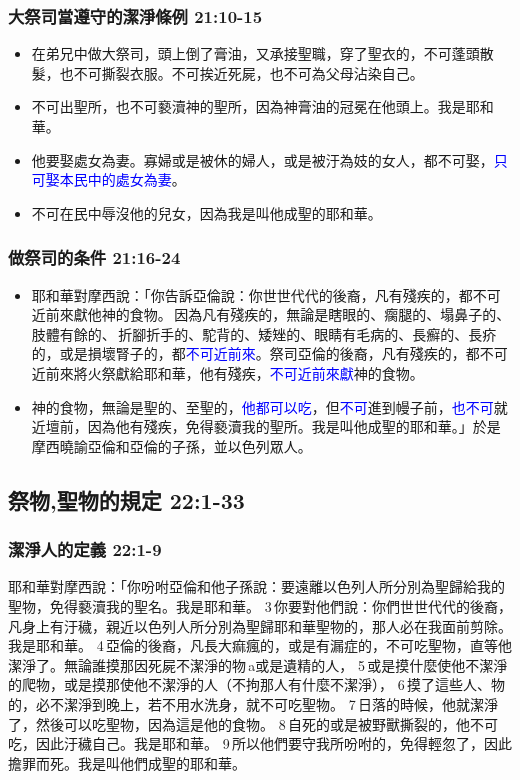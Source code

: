 \subsubsection{大祭司當遵守的潔淨條例 21:10-15}
\begin{itemize} 
\itemsep-.35em
\item 在弟兄中做大祭司，頭上倒了膏油，又承接聖職，穿了聖衣的，不可蓬頭散髮，也不可撕裂衣服。不可挨近死屍，也不可為父母沾染自己。 
\item 不可出聖所，也不可褻瀆神的聖所，因為神膏油的冠冕在他頭上。我是耶和華。
\item 他要娶處女為妻。寡婦或是被休的婦人，或是被汙為妓的女人，都不可娶，\textcolor{blue}{只可娶本民中的處女為妻}。 
\item 不可在民中辱沒他的兒女，因為我是叫他成聖的耶和華。
\end{itemize}

\subsubsection{做祭司的条件 21:16-24}
\begin{itemize} 
\itemsep-.35em
\item 耶和華對摩西說：「你告訴亞倫說：你世世代代的後裔，凡有殘疾的，都不可近前來獻他神的食物。 因為凡有殘疾的，無論是瞎眼的、瘸腿的、塌鼻子的、肢體有餘的、 折腳折手的、駝背的、矮矬的、眼睛有毛病的、長癬的、長疥的，或是損壞腎子的，都\textcolor{blue}{不可近前來}。祭司亞倫的後裔，凡有殘疾的，都不可近前來將火祭獻給耶和華，他有殘疾，\textcolor{blue}{不可近前來獻}神的食物。
\item 神的食物，無論是聖的、至聖的，\textcolor{blue}{他都可以吃}，但\textcolor{blue}{不可}進到幔子前，\textcolor{blue}{也不可}就近壇前，因為他有殘疾，免得褻瀆我的聖所。我是叫他成聖的耶和華。」於是摩西曉諭亞倫和亞倫的子孫，並以色列眾人。
\end{itemize}


\subsection{祭物,聖物的規定 22:1-33}
\subsubsection{潔淨人的定義 22:1-9}
耶和華對摩西說：「你吩咐亞倫和他子孫說：要遠離以色列人所分別為聖歸給我的聖物，免得褻瀆我的聖名。我是耶和華。 3 你要對他們說：你們世世代代的後裔，凡身上有汙穢，親近以色列人所分別為聖歸耶和華聖物的，那人必在我面前剪除。我是耶和華。 4 亞倫的後裔，凡長大痲瘋的，或是有漏症的，不可吃聖物，直等他潔淨了。無論誰摸那因死屍不潔淨的物 a或是遺精的人， 5 或是摸什麼使他不潔淨的爬物，或是摸那使他不潔淨的人（不拘那人有什麼不潔淨）， 6 摸了這些人、物的，必不潔淨到晚上，若不用水洗身，就不可吃聖物。 7 日落的時候，他就潔淨了，然後可以吃聖物，因為這是他的食物。 8 自死的或是被野獸撕裂的，他不可吃，因此汙穢自己。我是耶和華。 9 所以他們要守我所吩咐的，免得輕忽了，因此擔罪而死。我是叫他們成聖的耶和華。
 	

